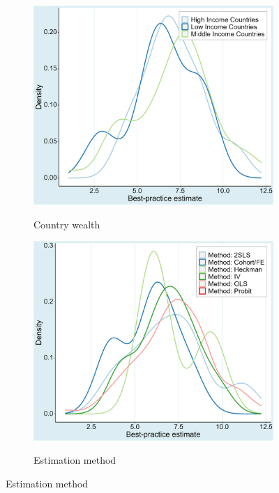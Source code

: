 \begin{figure}[!htbp]
\begin{center}
\begin{subfigure}[!htbp]{0.38\textwidth}
   \vspace{0.2cm}
   \caption{Country wealth}
   \vspace{-0.1cm}
   \includegraphics[width=0.95\linewidth]{Figures/BPE/bpe_income.png}
   \label{fig:bpe_income}
\end{subfigure}
\begin{subfigure}[!htbp]{0.38\textwidth}
   \vspace{0.2cm}
   \caption{Estimation method}
   \vspace{-0.1cm}
   \includegraphics[width=0.95\linewidth]{Figures/BPE/bpe_method.png}
   \label{fig:bpe_method} 
\end{subfigure}


\end{center}
\end{figure}
